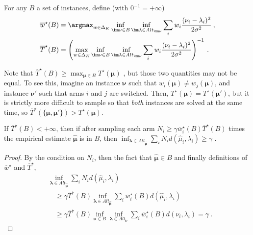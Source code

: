 \begin{definition}
	For any $B$ a set of instances, define (with $0^{-1} = +\infty$)
	\begin{align*}
	\overline{w}^\star(B) &= \argmax_{w\in \Delta_K} \inf_{\bm\nu \in B} \inf_{\bm\lambda\in Alt_{\bm\nu}} \sum_i w_i \frac{(\nu_i - \lambda_i)^2}{2 \sigma^2}
	\: , \\
	\overline{T}^\star(B) &= \left(\max_{w\in \Delta_K} \inf_{\bm\nu \in B} \inf_{\bm\lambda\in Alt_{\bm\nu}} \sum_i w_i \frac{(\nu_i - \lambda_i)^2}{2 \sigma^2}\right)^{-1}
	\: .
	\end{align*}
\end{definition}

Note that $\overline{T}^\star(B) \ge \max_{\bm\mu\in B} T^\star(\bm\mu)$ , but those two quantities may not be equal. To see this, imagine an instance $\bm\nu$ such that $w_i(\bm\mu)\neq w_j(\bm\mu)$, and instance $\bm\nu'$ such that arms $i$ and $j$ are switched. Then, $T^\star(\bm\mu)=T^\star(\bm\mu')$, but it is strictly more difficult to sample so that \textit{both} instances are solved at the same time, so $\overline{T}^\star(\{\bm\mu,\bm\mu'\})>T^\star(\bm\mu)$.

\begin{lemma}\label{lem:sufficientsampling}
If $\overline{T}^\star(B)< +\infty$, then if after sampling each arm $N_i \ge \gamma \overline{w}_i^\star(B) \overline{T}^\star(B)$ times the empirical estimate $\bm{\hat{\mu}}$ is in $B$, then
$\inf_{\bm{\lambda}\in Alt_{\bm{\hat{\mu}}}} \sum_i N_i d(\hat{\mu}_i,\lambda_i)
\ge \gamma
$\: .
\end{lemma}

\begin{proof}
By the condition on $N_i$, then the fact that $\hat{\bm\mu} \in B$ and finally definitions of $\overline{w}^\star$ and $\overline{T}^\star$,
\begin{align*}
&\inf_{\bm\lambda\in Alt_{\bm{\hat{\mu}}}}\sum_i N_i d(\hat{\mu}_i,\lambda_i)
\\
&\quad \ge \gamma \overline{T}^\star(B)\inf_{\bm{\lambda} \in Alt_{\bm{\hat{\mu}}}}\sum_i \overline{w}_i^\star(B)d(\hat{\mu}_i,\lambda_i)
\\
&\quad \ge \gamma \overline{T}^\star(B)\inf_{\bm{\nu}\in B}\inf_{\bm{\lambda} \in Alt_{\bm{\nu}}}\sum_i \overline{w}_i^\star(B)d(\nu_i,\lambda_i)
= \gamma
\: .
\end{align*}
\end{proof}


